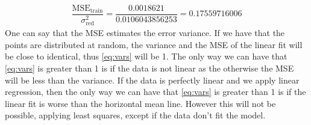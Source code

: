 \documentclass{article}
\begin{document}
\begin{align}
\label{eq:vars}
\dfrac{\text{MSE}_{\text{train}}}{\sigma^2_{\text{red}}} =
\dfrac{0.0018621}{0.0106043856253} = 0.17559716006
\end{align}
One can say that the MSE estimates the error variance. If we have that the points are distributed at random, the variance and the MSE of the linear fit will be close to identical, thus \eqref{eq:vars} will be 1. The only way we can have that \eqref{eq:vars} is greater than 1 is if the data is not linear as the otherwise the MSE will be less than the variance. If the data is perfectly linear and we apply linear regression, then the only way we can have that \eqref{eq:vars} is greater than 1 is if the linear fit is worse than the horizontal mean line. However this will not be possible, applying least squares, except if the data don't fit the model.
\end{document}
